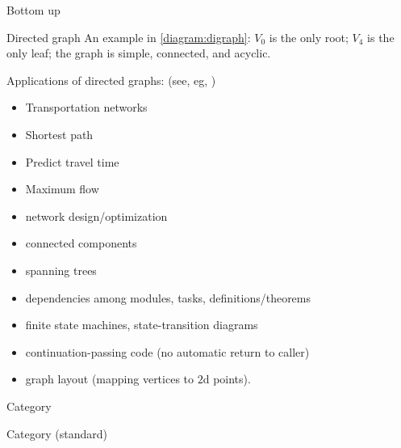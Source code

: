 \begin{plSection}{Bottom up}
\begin{plSection}{Directed graph}
An example in \cref{diagram:digraph}:
$V_0$ is the only root; $V_4$ is the only leaf;
the graph is simple, connected, and acyclic.

Applications of directed graphs:
(see, eg, 
)
\begin{itemize}
  \item Transportation networks
  \item Shortest path
  \item Predict travel time
  \item Maximum flow
  \item network design/optimization
  \item connected components
  \item spanning trees
  \item dependencies among modules, tasks, definitions/theorems
  \item finite state machines, state-transition diagrams
  \item continuation-passing code (no automatic return to caller)
  \item graph layout (mapping vertices to $2$d points).
\end{itemize}
\end{plSection}
\begin{plSection}{Category}
\label{sec:Category_from_digraph}

\begin{plSection}{Category (standard)}


\end{plSection}
\end{plSection}
\end{plSection}
